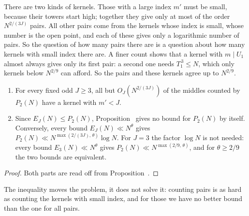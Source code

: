 \inwords There are two kinds of kernels. Those with a large index $m'$ must be small, because their towers start high; together they give only
at most of the order $N^{2/(3J)}$ pairs. All other pairs come from the kernels whose index is small, whose number is the open point, and each
of these gives only a logarithmic number of pairs. So the question of how many pairs there are is a question about how many kernels with
small index there are. A finer count shows that a kernel with $m \mid U_1$ almost always gives only its first pair: a second one needs
$T_1^{\,3} \le N$, which only kernels below $N^{2/9}$ can afford. So the pairs and these kernels agree up to $N^{2/9}$.

\begin{corollary}
\begin{enumerate}
\item[(a)] For every fixed odd $J \ge 3$, all but $O_J(N^{2/(3J)})$ of the middles counted by $P_2(N)$ have a kernel with $m' < J$.
\item[(b)] Since $E_J(N) \le P_2(N)$, Proposition~ gives no bound for $P_2(N)$ by itself. Conversely, every bound
  $E_J(N) \ll N^\theta$ gives $P_2(N) \ll N^{\max(2/(3J),\, \theta)} \log N$. For $J = 3$ the factor $\log N$ is not needed: every bound
  $E_3(N) \ll N^\theta$ gives $P_2(N) \ll N^{\max(2/9,\, \theta)}$, and for $\theta \ge 2/9$ the two bounds are equivalent.
\end{enumerate}
\end{corollary}

\begin{proof}
Both parts are read off from Proposition~.
\end{proof}

\inwords The inequality moves the problem, it does not solve it: counting pairs is as hard as counting the kernels with small index, and for
those we have no better bound than the one for all pairs.

